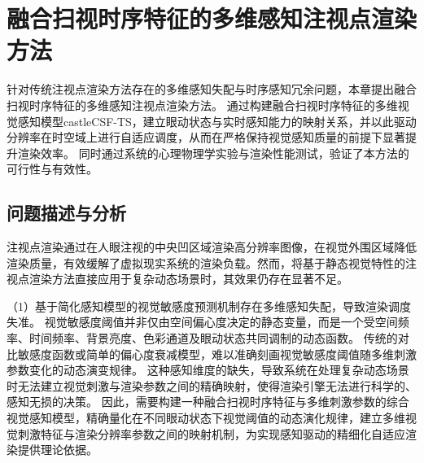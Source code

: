 \chapter{融合扫视时序特征的多维感知注视点渲染方法}
针对传统注视点渲染方法存在的多维感知失配与时序感知冗余问题，本章提出融合扫视时序特征的多维感知注视点渲染方法。
通过构建融合扫视时序特征的多维视觉感知模型castleCSF-TS，建立眼动状态与实时感知能力的映射关系，并以此驱动分辨率在时空域上进行自适应调度，从而在严格保持视觉感知质量的前提下显著提升渲染效率。
同时通过系统的心理物理学实验与渲染性能测试，验证了本方法的可行性与有效性。

\section{问题描述与分析}

注视点渲染通过在人眼注视的中央凹区域渲染高分辨率图像，在视觉外围区域降低渲染质量，有效缓解了虚拟现实系统的渲染负载。然而，将基于静态视觉特性的注视点渲染方法直接应用于复杂动态场景时，其效果仍存在显著不足。



（1）基于简化感知模型的视觉敏感度预测机制存在多维感知失配，导致渲染调度失准。
视觉敏感度阈值并非仅由空间偏心度决定的静态变量，而是一个受空间频率、时间频率、背景亮度、色彩通道及眼动状态共同调制的动态函数。
传统的对比敏感度函数或简单的偏心度衰减模型，难以准确刻画视觉敏感度阈值随多维刺激参数变化的动态演变规律。
这种感知维度的缺失，导致系统在处理复杂动态场景时无法建立视觉刺激与渲染参数之间的精确映射，使得渲染引擎无法进行科学的、感知无损的决策。
因此，需要构建一种融合扫视时序特征与多维刺激参数的综合视觉感知模型，精确量化在不同眼动状态下视觉阈值的动态演化规律，建立多维视觉刺激特征与渲染分辨率参数之间的映射机制，为实现感知驱动的精细化自适应渲染提供理论依据。


